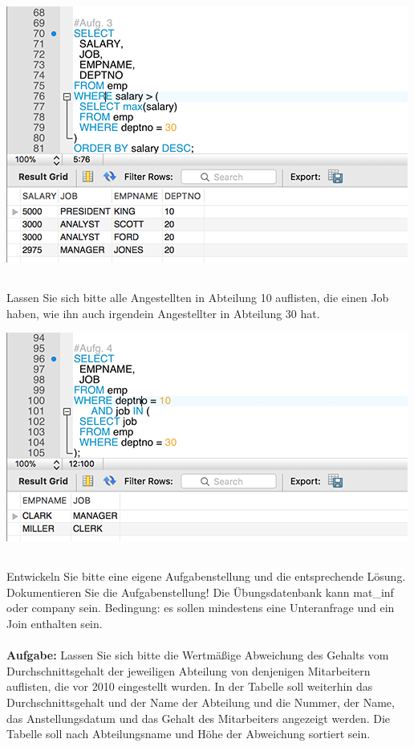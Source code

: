 \documentclass{article}
\begin{document}
\includegraphics{company3}

\pagebreak
\subsection{}
Lassen Sie sich bitte alle Angestellten in Abteilung 10 auflisten, die einen Job haben, wie ihn auch irgendein Angestellter in Abteilung 30 hat.

\includegraphics{company4}

\subsection{}
Entwickeln Sie bitte eine eigene Aufgabenstellung und die entsprechende Lösung. Dokumentieren Sie die Aufgabenstellung! Die Übungsdatenbank kann mat\_inf oder company sein. Bedingung: es sollen mindestens eine Unteranfrage und ein Join enthalten sein.
\\\\
\textbf {Aufgabe:} Lassen Sie sich bitte die Wertmäßige Abweichung des Gehalts vom Durchschnittsgehalt der jeweiligen Abteilung von denjenigen Mitarbeitern auflisten, die vor 2010 eingestellt wurden. In der Tabelle soll weiterhin das Durchschnittsgehalt und der Name der Abteilung und die Nummer, der Name, das Anstellungsdatum und das Gehalt des Mitarbeiters  angezeigt werden. Die Tabelle soll nach Abteilungsname und Höhe der Abweichung sortiert sein.
\end{document}
